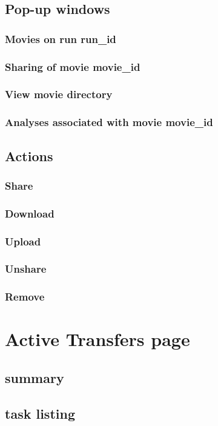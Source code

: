 \documentclass{report}
\begin{document}
\section{Pop-up windows}
\subsection{Movies on run run\_id}
\subsection{Sharing of movie movie\_id}
\subsection{View movie directory}
\subsection{Analyses associated with movie movie\_id}
\section{Actions}
\subsection{Share}
\subsection{Download}
\subsection{Upload}
\subsection{Unshare}
\subsection{Remove}

\chapter{Active Transfers page}
\section{summary}
\section{task listing}
\end{document}

